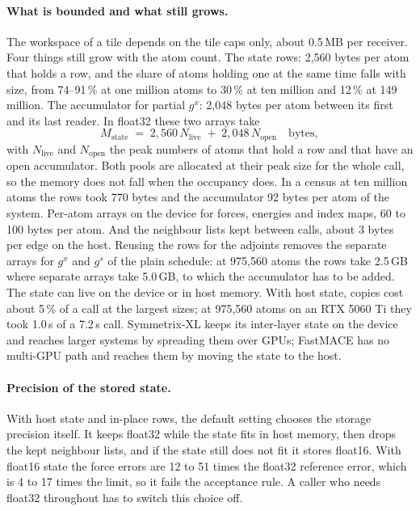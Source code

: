 \documentclass[11pt]{article}
\begin{document}
\paragraph{What is bounded and what still grows.}
The workspace of a tile depends on the tile caps only, about 0.5\,MB per receiver. Four things still grow with
the atom count. The state rows: 2{,}560 bytes per atom that holds a row, and the share of atoms holding one at
the same time falls with size, from 74--91\,\% at one million atoms to 30\,\% at ten million and 12\,\% at 149
million. The accumulator for partial $g^x$: 2{,}048 bytes per atom between its first and its last reader. In
float32 these two arrays take
\begin{equation}
M_{\text{state}} \;=\; 2{,}560\,N_{\text{live}} \;+\; 2{,}048\,N_{\text{open}} \quad\text{bytes},
\end{equation}
with $N_{\text{live}}$ and $N_{\text{open}}$ the peak numbers of atoms that hold a row and that have an open
accumulator. Both pools are allocated at their peak size for the whole call, so the memory does not fall when
the occupancy does. In a census at ten million atoms the rows took 770 bytes and the accumulator 92 bytes per
atom of the system. Per-atom
arrays on the device for forces, energies and index maps, 60 to 100 bytes per atom. And the neighbour lists
kept between calls, about 3 bytes per edge on the host. Reusing the rows for the adjoints removes the separate
arrays for $g^x$ and $g^s$ of the plain schedule: at 975{,}560 atoms the rows take 2.5\,GB where separate
arrays take 5.0\,GB, to which the accumulator has to be added. The state can live on the device or in host
memory. With
host state, copies cost about 5\,\% of a call at the largest sizes; at 975{,}560 atoms on an RTX 5060 Ti they
took 1.0\,s of a 7.2\,s call. Symmetrix-XL keeps its inter-layer state on the device and reaches larger systems
by spreading them over GPUs; FastMACE has no multi-GPU path and reaches them by moving the state to the host.

\paragraph{Precision of the stored state.}
With host state and in-place rows, the default setting chooses the storage precision itself. It keeps float32
while the state fits in host memory, then drops the kept neighbour lists, and if the state still does not fit it
stores float16. With float16 state the force errors are 12 to 51 times the float32 reference error, which is 4
to 17 times the limit, so it fails the acceptance rule. A caller who needs float32
throughout has to switch this choice off.
\end{document}
